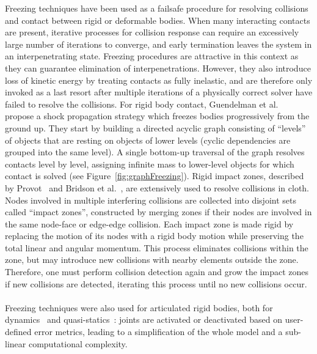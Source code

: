 Freezing techniques have been used as a failsafe procedure for resolving collisions and contact between rigid or deformable bodies.
When many interacting contacts are present, iterative processes for collision response can require an excessively large number of iterations to converge, and early termination leaves the system in an interpenetrating state.
Freezing procedures are attractive in this context as they can guarantee elimination of interpenetrations.
However, they also introduce loss of kinetic energy by treating contacts as fully inelastic, and are therefore only invoked as a last resort after multiple iterations of a physically correct solver have failed to resolve the collisions.
For rigid body contact, Guendelman et al.~\cite{Guendelman2003} propose a shock propagation strategy which freezes bodies progressively from the ground up.
They start by building a directed acyclic graph consisting of ``levels'' of objects that are resting on objects of lower levels (cyclic dependencies are grouped into the same level).
A single bottom-up traversal of the graph resolves contacts level by level, assigning infinite mass to lower-level objects for which contact is solved (see Figure~\ref{fig:graphFreezing}).
Rigid impact zones, described by Provot~\cite{Provot1997} and Bridson et al.~\cite{Bridson2002}, are extensively used to resolve collisions in cloth.
Nodes involved in multiple interfering collisions are collected into disjoint sets called ``impact zones'', constructed by merging zones if their nodes are involved in the same node-face or edge-edge collision.
Each impact zone is made rigid by replacing the motion of its nodes with a rigid body motion while preserving the total linear and angular momentum.
This process eliminates collisions within the zone, but may introduce new collisions with nearby elements outside the zone.
Therefore, one must perform collision detection again and grow the impact zones if new collisions are detected, iterating this process until no new collisions occur.
\paragraph*{}
Freezing techniques were also used for articulated rigid bodies, both for dynamics~\cite{Redon2005} and quasi-statics~\cite{Redon2006}: joints are activated or deactivated based on user-defined error metrics, leading to a simplification of the whole model and a sub-linear computational complexity.

